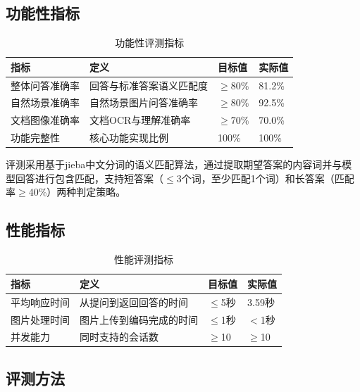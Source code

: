 \subsection{功能性指标}

\begin{table}[htbp]
  \centering
  \caption{功能性评测指标}
  \label{tab:func_metrics}
  \begin{tabular}{|l|l|l|l|}
    \hline
    \textbf{指标} & \textbf{定义} & \textbf{目标值} & \textbf{实际值} \\
    \hline
    整体问答准确率 & 回答与标准答案语义匹配度 & $\geq$80\% & 81.2\% \\
    \hline
    自然场景准确率 & 自然场景图片问答准确率 & $\geq$80\% & 92.5\% \\
    \hline
    文档图像准确率 & 文档OCR与理解准确率 & $\geq$70\% & 70.0\% \\
    \hline
    功能完整性 & 核心功能实现比例 & 100\% & 100\% \\
    \hline
  \end{tabular}
\end{table}

评测采用基于jieba中文分词的语义匹配算法，通过提取期望答案的内容词并与模型回答进行包含匹配，支持短答案（$\leq$3个词，至少匹配1个词）和长答案（匹配率$\geq$40\%）两种判定策略。

\subsection{性能指标}

\begin{table}[htbp]
  \centering
  \caption{性能评测指标}
  \label{tab:perf_metrics}
  \begin{tabular}{|l|l|l|l|}
    \hline
    \textbf{指标} & \textbf{定义} & \textbf{目标值} & \textbf{实际值} \\
    \hline
    平均响应时间 & 从提问到返回回答的时间 & $\leq$5秒 & 3.59秒 \\
    \hline
    图片处理时间 & 图片上传到编码完成的时间 & $\leq$1秒 & $<$1秒 \\
    \hline
    并发能力 & 同时支持的会话数 & $\geq$10 & $\geq$10 \\
    \hline
  \end{tabular}
\end{table}

\subsection{评测方法}


